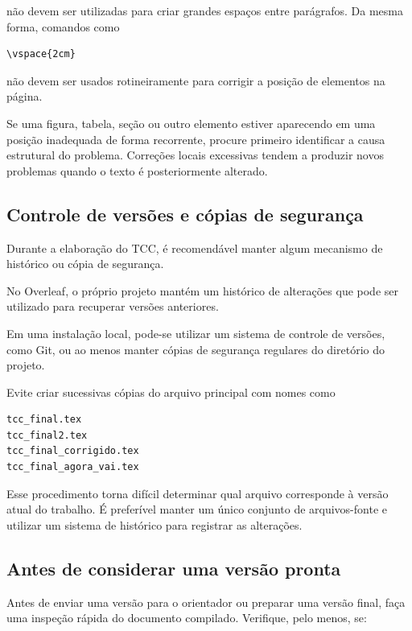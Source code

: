 não devem ser utilizadas para criar grandes espaços entre parágrafos. Da mesma forma, comandos como

\begin{verbatim}
\vspace{2cm}
\end{verbatim}

não devem ser usados rotineiramente para corrigir a posição de elementos na página.

Se uma figura, tabela, seção ou outro elemento estiver aparecendo em uma posição inadequada de forma recorrente, procure primeiro identificar a causa estrutural do problema. Correções locais excessivas tendem a produzir novos problemas quando o texto é posteriormente alterado.

\subsection{Controle de versões e cópias de segurança}
\label{ssec:controle_versoes}

Durante a elaboração do TCC, é recomendável manter algum mecanismo de histórico ou cópia de segurança.

No Overleaf, o próprio projeto mantém um histórico de alterações que pode ser utilizado para recuperar versões anteriores.

Em uma instalação local, pode-se utilizar um sistema de controle de versões, como Git, ou ao menos manter cópias de segurança regulares do diretório do projeto.

Evite criar sucessivas cópias do arquivo principal com nomes como

\begin{verbatim}
tcc_final.tex
tcc_final2.tex
tcc_final_corrigido.tex
tcc_final_agora_vai.tex
\end{verbatim}

Esse procedimento torna difícil determinar qual arquivo corresponde à versão atual do trabalho. É preferível manter um único conjunto de arquivos-fonte e utilizar um sistema de histórico para registrar as alterações.

\subsection{Antes de considerar uma versão pronta}
\label{ssec:checagem_rapida}

Antes de enviar uma versão para o orientador ou preparar uma versão final, faça uma inspeção rápida do documento compilado. Verifique, pelo menos, se:


